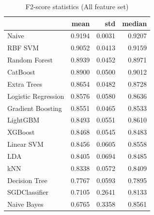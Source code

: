 \begin{table}
\caption{F2-score statistics (All feature set)}
\label{tab:f2_All_stats}
\begin{tabular}{lrrr}
\toprule
 & mean & std & median \\
\midrule
Naive & 0.9194 & 0.0031 & 0.9207 \\
RBF SVM & 0.9052 & 0.0413 & 0.9159 \\
Random Forest & 0.8939 & 0.0452 & 0.8971 \\
CatBoost & 0.8900 & 0.0500 & 0.9012 \\
Extra Trees & 0.8654 & 0.0482 & 0.8728 \\
Logistic Regression & 0.8576 & 0.0580 & 0.8636 \\
Gradient Boosting & 0.8551 & 0.0465 & 0.8533 \\
LightGBM & 0.8493 & 0.0551 & 0.8610 \\
XGBoost & 0.8468 & 0.0545 & 0.8483 \\
Linear SVM & 0.8456 & 0.0605 & 0.8558 \\
LDA & 0.8405 & 0.0694 & 0.8485 \\
kNN & 0.8338 & 0.0572 & 0.8409 \\
Decision Tree & 0.7767 & 0.0593 & 0.7895 \\
SGDClassifier & 0.7105 & 0.2641 & 0.8133 \\
Naive Bayes & 0.6765 & 0.3358 & 0.8561 \\
\bottomrule
\end{tabular}
\end{table}
